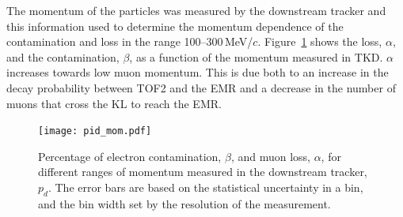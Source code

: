 The momentum of the particles was measured by the downstream tracker 
and this information used to determine the momentum dependence of the 
contamination and loss in the range 100--300\,MeV/$c$.
Figure~\ref{fig:emr_pid_mom} shows the loss, $\alpha$, and the
contamination, $\beta$, as a function of the momentum measured in
TKD.
$\alpha$ increases towards low muon momentum.
This is due both to an increase in the decay probability between TOF2
and the EMR and a decrease in the number of muons that cross the KL to
reach the EMR. 
\begin{figure}
  \begin{center}
    \texttt{[image: pid\_mom.pdf]}
  \end{center}
  \caption{
    Percentage of electron contamination, $\beta$, and muon loss,
    $\alpha$, for different ranges of momentum measured in the
    downstream tracker, $p_d$.
    The error bars are based on the statistical uncertainty in a bin,
    and the bin width set by the resolution of the measurement.
  }
  \label{fig:emr_pid_mom}
\end{figure}
